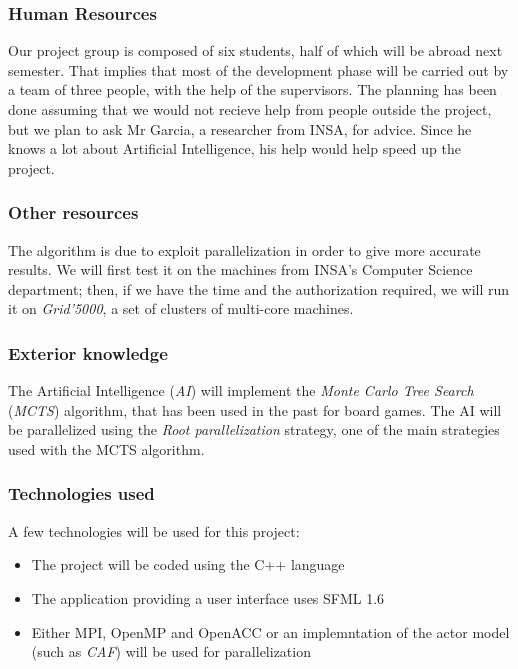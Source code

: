 \subsubsection{Human Resources}

Our project group is composed of six students, half of which will be abroad next semester.
That implies that most of the development phase will be carried out by a team of three people, with the help of the supervisors.
The planning has been done assuming that we would not recieve help from people outside the project, but we plan to ask Mr Garcia, a researcher from INSA, for advice.
Since he knows a lot about Artificial Intelligence, his help would help speed up the project.

\subsubsection{Other resources}

The algorithm is due to exploit parallelization in order to give more accurate results. We will first test it on the machines from INSA's Computer Science department;
then, if we have the time and the authorization required, we will run it on \emph{Grid'5000}, a set of clusters of multi-core machines.

\subsubsection{Exterior knowledge}

The Artificial Intelligence (\emph{AI}) will implement the \emph{Monte Carlo Tree Search} (\emph{MCTS}) algorithm, that has been used in the past for board games.
The AI will be parallelized using the \emph{Root parallelization} strategy, one of the main strategies used with the MCTS algorithm.

\subsubsection{Technologies used}

A few technologies will be used for this project:
\begin{itemize}
	\item The project will be coded using the C++ language
	\item The application providing a user interface uses SFML 1.6
	\item Either MPI, OpenMP and OpenACC or an implemntation of the actor model (such as \emph{CAF}) will be used for parallelization
\end{itemize}